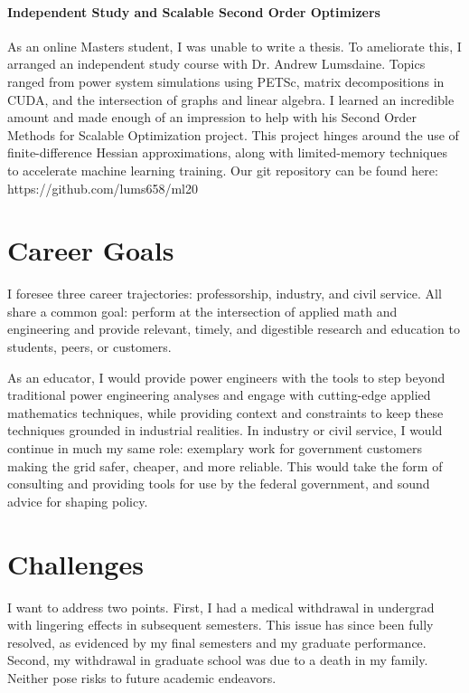 \documentclass[letterpaper]{article}
\begin{document}
\paragraph{Independent Study and Scalable Second Order Optimizers}
As an online Masters student, I was unable to write a thesis. To ameliorate this, I arranged an
independent study course with Dr. Andrew Lumsdaine.
Topics ranged from power system simulations using PETSc, matrix decompositions in CUDA, and the
intersection of graphs and linear algebra. I learned an incredible amount and made enough of an
impression to help with his Second Order Methods for Scalable Optimization project. This project
hinges around the use of finite-difference Hessian approximations, along with limited-memory
techniques to accelerate machine learning training. Our git repository can be found here:
https://github.com/lums658/ml20

\section*{Career Goals}
I foresee three career trajectories: professorship, industry, and civil service.
All share a common goal: perform at the intersection of applied math and engineering
and provide relevant, timely, and digestible research and education to students,
peers, or customers.

As an educator, I would provide power engineers with the tools
to step beyond traditional power engineering analyses and engage with cutting-edge applied
mathematics techniques, while providing context and constraints to keep these techniques grounded in
industrial realities.  In industry or civil service, I would continue in much my same role:
exemplary work for government customers making the grid safer, cheaper, and more reliable.
This would take the form of consulting and providing tools for use by the federal
government, and sound advice for shaping policy.

\section*{Challenges}
I want to address two points. First, I had a medical withdrawal in undergrad with lingering
effects in subsequent semesters. This issue has since been fully resolved, as evidenced
by my final semesters and my graduate performance. Second, my withdrawal in graduate school was
due to a death in my family. Neither pose risks to future academic endeavors.
\end{document}
